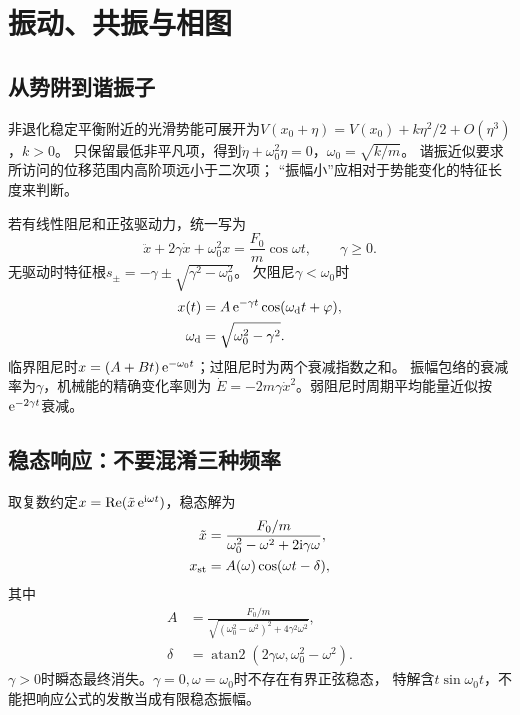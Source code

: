 \chapter{振动、共振与相图}

\section{从势阱到谐振子}
非退化稳定平衡附近的光滑势能可展开为$V(x_0 + \eta) = V(x_0) + k\eta^2/2 + O(\eta^3)$，$k > 0$。
只保留最低非平凡项，得到$\ddot\eta + \omega_0^2\eta = 0$，$\omega_0 = \sqrt{k/m}$。
谐振近似要求所访问的位移范围内高阶项远小于二次项；
“振幅小”应相对于势能变化的特征长度来判断。

若有线性阻尼和正弦驱动力，统一写为
\begin{equation}
 \ddot x + 2\gamma\dot x + \omega_0^2x = \frac{F_0}{m}\cos\omega t,
 \qquad \gamma \geq 0.
 \label{eq:cm-driven}
\end{equation}
无驱动时特征根$s_\pm = -\gamma \pm \sqrt{\gamma^2 - \omega_0^2}$。
欠阻尼$\gamma < \omega_0$时
\begin{subequations}
 \begin{align}
  x(t) &= A\mathop{}\!\mathrm{e}^{-\gamma t}\cos(\omega_{\mathrm d} t + \varphi),\\
  \omega_{\mathrm d} &= \sqrt{\omega_0^2 - \gamma^2}.
 \end{align}
\end{subequations}
临界阻尼时$x = (A + Bt)\mathop{}\!\mathrm{e}^{-\omega_0t}$；过阻尼时为两个衰减指数之和。
振幅包络的衰减率为$\gamma$，机械能的精确变化率则为
$\dot E = -2m\gamma\dot x^2$。弱阻尼时周期平均能量近似按$\mathop{}\!\mathrm{e}^{-2\gamma t}$衰减。

\section{稳态响应：不要混淆三种频率}
取复数约定$x = \operatorname{Re}(\tilde x\mathop{}\!\mathrm{e}^{\mathrm{i}\omega t})$，稳态解为
\begin{subequations}
 \begin{align}
  \tilde x &= \frac{F_0/m}{\omega_0^2 - \omega^2 + 2\mathrm{i}\gamma\omega},\\
  x_{\mathrm{st}} &= A(\omega)\cos(\omega t - \delta),
 \end{align}
\end{subequations}
其中
\begin{subequations}
 \begin{align}
  A &= \frac{F_0/m}{\sqrt{(\omega_0^2 - \omega^2)^2 + 4\gamma^2\omega^2}},\\
  \delta &= \operatorname{atan2}(2\gamma\omega,\omega_0^2 - \omega^2).
 \end{align}
\end{subequations}
$\gamma > 0$时瞬态最终消失。$\gamma = 0,\omega = \omega_0$时不存在有界正弦稳态，
特解含$t\sin\omega_0t$，不能把响应公式的发散当成有限稳态振幅。

